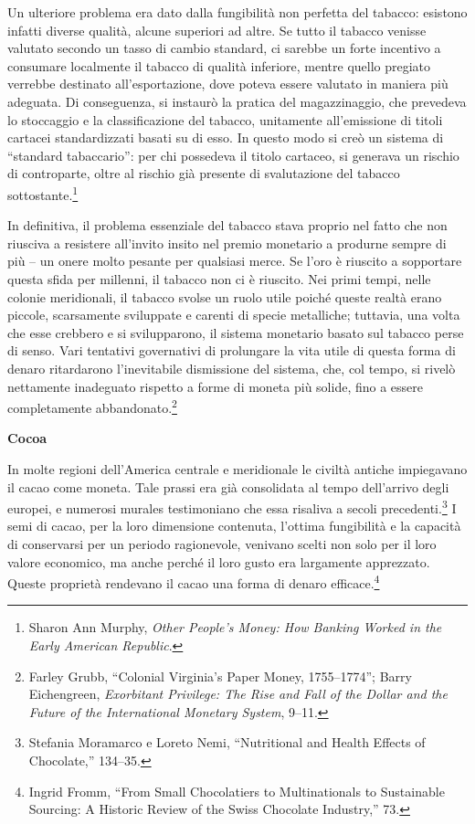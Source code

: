 \documentclass[
  a5paper,
  smalldemyvopaper,10pt,twoside,onecolumn,openright,extrafontsizes,hidelinks]{memoir}
\begin{document}
Un ulteriore problema era dato dalla fungibilità non perfetta del
tabacco: esistono infatti diverse qualità, alcune superiori ad altre. Se
tutto il tabacco venisse valutato secondo un tasso di cambio standard,
ci sarebbe un forte incentivo a consumare localmente il tabacco di
qualità inferiore, mentre quello pregiato verrebbe destinato
all'esportazione, dove poteva essere valutato in maniera più adeguata.
Di conseguenza, si instaurò la pratica del magazzinaggio, che prevedeva
lo stoccaggio e la classificazione del tabacco, unitamente all'emissione
di titoli cartacei standardizzati basati su di esso. In questo modo si
creò un sistema di ``standard tabaccario'': per chi possedeva il titolo
cartaceo, si generava un rischio di controparte, oltre al rischio già
presente di svalutazione del tabacco sottostante.\footnote{Sharon Ann
  Murphy, \emph{Other People's Money: How Banking Worked in the Early
  American Republic}.}

In definitiva, il problema essenziale del tabacco stava proprio nel
fatto che non riusciva a resistere all'invito insito nel premio
monetario a produrne sempre di più -- un onere molto pesante per
qualsiasi merce. Se l'oro è riuscito a sopportare questa sfida per
millenni, il tabacco non ci è riuscito. Nei primi tempi, nelle colonie
meridionali, il tabacco svolse un ruolo utile poiché queste realtà erano
piccole, scarsamente sviluppate e carenti di specie metalliche;
tuttavia, una volta che esse crebbero e si svilupparono, il sistema
monetario basato sul tabacco perse di senso. Vari tentativi governativi
di prolungare la vita utile di questa forma di denaro ritardarono
l'inevitabile dismissione del sistema, che, col tempo, si rivelò
nettamente inadeguato rispetto a forme di moneta più solide, fino a
essere completamente abbandonato.\footnote{Farley Grubb, ``Colonial
  Virginia's Paper Money, 1755--1774''; Barry Eichengreen,
  \emph{Exorbitant Privilege: The Rise and Fall of the Dollar and the
  Future of the International Monetary System}, 9--11.}

\textbf{Cocoa}

In molte regioni dell'America centrale e meridionale le civiltà antiche
impiegavano il cacao come moneta. Tale prassi era già consolidata al
tempo dell'arrivo degli europei, e numerosi murales testimoniano che
essa risaliva a secoli precedenti.\footnote{Stefania Moramarco e Loreto
  Nemi, ``Nutritional and Health Effects of Chocolate,'' 134--35.} I
semi di cacao, per la loro dimensione contenuta, l'ottima fungibilità e
la capacità di conservarsi per un periodo ragionevole, venivano scelti
non solo per il loro valore economico, ma anche perché il loro gusto era
largamente apprezzato. Queste proprietà rendevano il cacao una forma di
denaro efficace.\footnote{Ingrid Fromm, ``From Small Chocolatiers to
  Multinationals to Sustainable Sourcing: A Historic Review of the Swiss
  Chocolate Industry,'' 73.}
\end{document}
